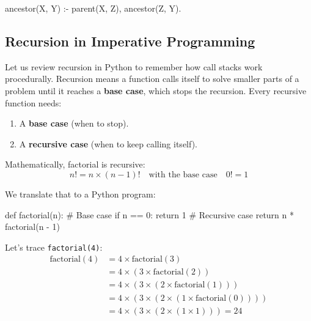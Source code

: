 \begin{codeblock}
ancestor(X, Y) :-
    parent(X, Z),
    ancestor(Z, Y).
\end{codeblock}

\subsection{Recursion in Imperative Programming}

Let us review recursion in Python to remember how call stacks work procedurally. Recursion means a function calls itself to solve smaller parts of a problem until it reaches a \textbf{base case}, which stops the recursion. Every recursive function needs:
\begin{enumerate}
    \item A \textbf{base case} (when to stop).
    \item A \textbf{recursive case} (when to keep calling itself).
\end{enumerate}

\begin{example}[Factorial]{}
Mathematically, factorial is recursive:
\[
n! = n \times (n - 1)! \quad \text{with the base case} \quad 0! = 1
\]

We translate that to a Python program:

\begin{codeblock}
def factorial(n):
    # Base case
    if n == 0:
        return 1
    # Recursive case
    return n * factorial(n - 1)
\end{codeblock}

Let's trace \texttt{factorial(4)}:
\[
\begin{aligned}
\text{factorial}(4) &= 4 \times \text{factorial}(3) \\
             &= 4 \times (3 \times \text{factorial}(2)) \\
             &= 4 \times (3 \times (2 \times \text{factorial}(1))) \\
             &= 4 \times (3 \times (2 \times (1 \times \text{factorial}(0)))) \\
             &= 4 \times (3 \times (2 \times (1 \times 1))) = 24
\end{aligned}
\]
\end{example}


